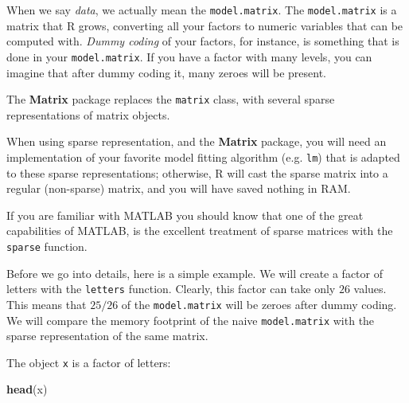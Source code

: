 \documentclass[]{book}
\newenvironment{Shaded}{\begin{snugshade}}{\end{snugshade}}
\newcommand{\CommentTok}[1]{\textcolor[rgb]{0.56,0.35,0.01}{\textit{#1}}}
\newcommand{\DataTypeTok}[1]{\textcolor[rgb]{0.13,0.29,0.53}{#1}}
\newcommand{\FloatTok}[1]{\textcolor[rgb]{0.00,0.00,0.81}{#1}}
\newcommand{\KeywordTok}[1]{\textcolor[rgb]{0.13,0.29,0.53}{\textbf{#1}}}
\newcommand{\NormalTok}[1]{#1}
\newcommand{\OperatorTok}[1]{\textcolor[rgb]{0.81,0.36,0.00}{\textbf{#1}}}
\newcommand{\OtherTok}[1]{\textcolor[rgb]{0.56,0.35,0.01}{#1}}
\newcommand{\StringTok}[1]{\textcolor[rgb]{0.31,0.60,0.02}{#1}}
\theoremstyle{definition}
\theoremstyle{definition}
\theoremstyle{definition}
\theoremstyle{remark}
\let\BeginKnitrBlock\begin \let\EndKnitrBlock\end
\begin{document}
When we say \emph{data}, we actually mean the \texttt{model.matrix}.
The \texttt{model.matrix} is a matrix that R grows, converting all your factors to numeric variables that can be computed with.
\emph{Dummy coding} of your factors, for instance, is something that is done in your \texttt{model.matrix}.
If you have a factor with many levels, you can imagine that after dummy coding it, many zeroes will be present.

The \textbf{Matrix} package replaces the \texttt{matrix} class, with several sparse representations of matrix objects.

When using sparse representation, and the \textbf{Matrix} package, you will need an implementation of your favorite model fitting algorithm (e.g. \texttt{lm}) that is adapted to these sparse representations; otherwise, R will cast the sparse matrix into a regular (non-sparse) matrix, and you will have saved nothing in RAM.

\BeginKnitrBlock{remark}
{}If you are familiar with MATLAB you should know that one of the great capabilities of MATLAB, is the excellent treatment of sparse matrices with the \texttt{sparse} function.
\EndKnitrBlock{remark}

Before we go into details, here is a simple example.
We will create a factor of letters with the \texttt{letters} function.
Clearly, this factor can take only \(26\) values.
This means that \(25/26\) of the \texttt{model.matrix} will be zeroes after dummy coding.
We will compare the memory footprint of the naive \texttt{model.matrix} with the sparse representation of the same matrix.

\begin{Shaded}
\end{Shaded}

The object \texttt{x} is a factor of letters:

\begin{Shaded}
\begin{Highlighting}[]
\KeywordTok{head}\NormalTok{(x)}
\end{Highlighting}
\end{Shaded}
\end{document}

